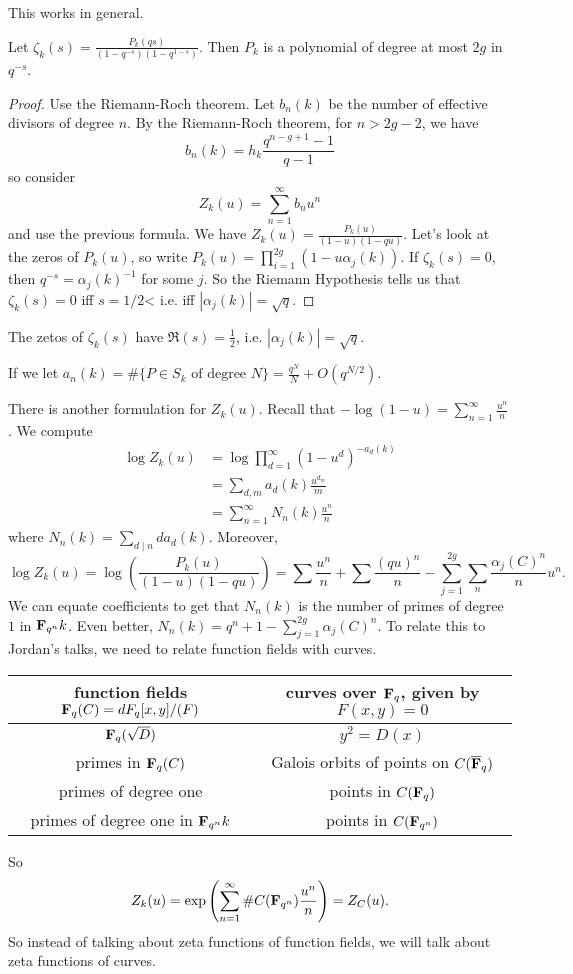 This works in general. 

\begin{theorem}
Let $\zeta_k(s) = \frac{P_k(q s)}{(1-q^{-s})(1-q^{1-s})}$. Then $P_k$ is a 
polynomial of degree at most $2 g$ in $q^{-s}$. 
\end{theorem}
\begin{proof}
Use the Riemann-Roch theorem. Let $b_n(k)$ be the number of effective divisors 
of degree $n$. By the Riemann-Roch theorem, for $n>2 g-2$, we have 
\[
  b_n(k) = h_k \frac{q^{n-g+1}-1}{q-1} 
\]
so consider 
\[
  Z_k(u) = \sum_{n=1}^\infty b_n u^n 
\]
and use the previous formula. We have $Z_k(u)=\frac{P_k(u)}{(1-u)(1-q u)}$. Let's 
look at the zeros of $P_k(u)$, so write 
$P_k(u) = \prod_{i=1}^{2 g} (1-u \alpha_j(k))$. If $\zeta_k(s)=0$, then 
$q^{-s} = \alpha_j(k)^{-1}$ for some $j$. So the Riemann Hypothesis tells us that 
$\zeta_k(s)=0$ iff $s=1/2$< i.e. iff $|\alpha_j(k)|=\sqrt q$. 
\end{proof}

\begin{theorem}
The zetos of $\zeta_k(s)$ have $\Re(s)=\frac 1 2$, i.e. 
$|\alpha_j(k)| = \sqrt q$. 
\end{theorem}

\begin{corollary}
If we let $a_n(k) = \#\{P\in S_k\text{ of degree $N$}\} = \frac{q^N}{N}+O(q^{N/2})$. 
\end{corollary}

There is another formulation for $Z_k(u)$. Recall that 
$-\log(1-u) = \sum_{n=1}^\infty \frac{u^n}{n}$. We compute 
\begin{align*}
  \log Z_k(u) 
    &= \log \prod_{d=1}^\infty (1-u^d)^{-a_d(k)} \\
    &= \sum_{d,m} a_d(k) \frac{u^{d_m}}{m} \\
    &= \sum_{n=1}^\infty N_n(k) \frac{u^n}{n}
\end{align*}
where $N_n(k) = \sum_{d\mid n} d a_d(k)$. Moreover, 
\[
  \log Z_k(u) = \log\left(\frac{P_k(u)}{(1-u)(1-q u)}\right) = \sum \frac{u^n}{n} + \sum \frac{(q u)^n}{n} - \sum_{j=1}^{2 g} \sum_n \frac{\alpha_j(C)^n}{n} u^n .
\]
We can equate coefficients to get that $N_n(k)$ is the number of primes of 
degree $1$ in $\mathbf{F}_{q^n} k$. Even better, 
$N_n(k) = q^n+1 - \sum_{j=1}^{2 g} \alpha_j(C)^n$. To relate this to Jordan's 
talks, we need to relate function fields with curves. 
\begin{center}
\begin{tabular}{c|c}
function fields $\mathbf{F}_q(C)=dF_q[x,y]/(F)$ & curves over $\mathbf{F}_q$, given by $F(x,y) = 0$ \\ \hline
$\mathbf{F}_q(\sqrt D)$ & $y^2 = D(x)$ \\
primes in $\mathbf{F}_q(C)$ & Galois orbits of points on $C(\overline{\mathbf{F}}_q)$ \\
primes of degree one & points in $C(\mathbf{F}_q)$ \\
primes of degree one in $\mathbf{F}_{q^n} k$ & points in $C(\mathbf{F}_{q^n})$
\end{tabular}
\end{center}

So 
\[
  Z_k(u) = \exp\left(\sum_{n=1}^\infty \# C(\mathbf{F}_{q^n}) \frac{u^n}{n}\right) = Z_C(u) .
\]
So instead of talking about zeta functions of function fields, we will talk about 
zeta functions of curves. 




